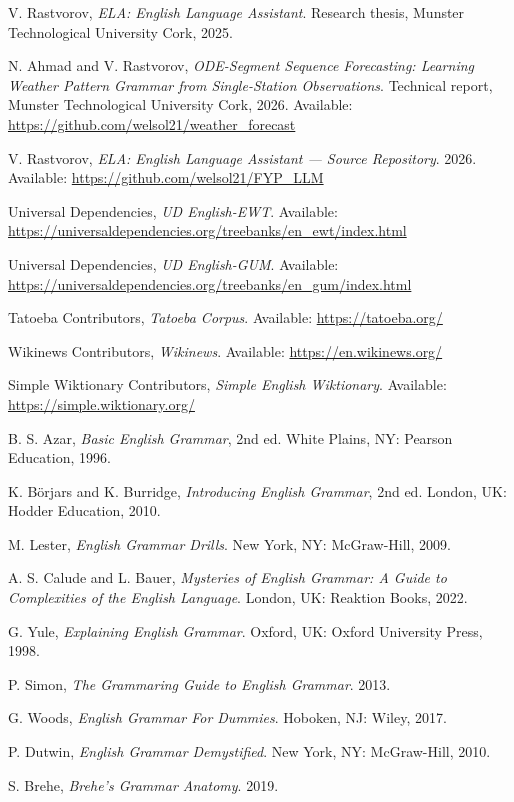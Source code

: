 \documentclass[12pt,a4paper,oneside]{report}
\begin{document}
\begin{enumerate}[label={[\arabic*]}]
  \item V. Rastvorov, \emph{ELA: English Language Assistant}. Research thesis, Munster Technological University Cork, 2025.
  \item N. Ahmad and V. Rastvorov, \emph{ODE-Segment Sequence Forecasting: Learning Weather Pattern Grammar from Single-Station Observations}. Technical report, Munster Technological University Cork, 2026. Available: \url{https://github.com/welsol21/weather_forecast}
  \item V. Rastvorov, \emph{ELA: English Language Assistant --- Source Repository}. 2026. Available: \url{https://github.com/welsol21/FYP_LLM}
  \item Universal Dependencies, \emph{UD English-EWT}. Available: \url{https://universaldependencies.org/treebanks/en_ewt/index.html}
  \item Universal Dependencies, \emph{UD English-GUM}. Available: \url{https://universaldependencies.org/treebanks/en_gum/index.html}
  \item Tatoeba Contributors, \emph{Tatoeba Corpus}. Available: \url{https://tatoeba.org/}
  \item Wikinews Contributors, \emph{Wikinews}. Available: \url{https://en.wikinews.org/}
  \item Simple Wiktionary Contributors, \emph{Simple English Wiktionary}. Available: \url{https://simple.wiktionary.org/}
  \item B. S. Azar, \emph{Basic English Grammar}, 2nd ed. White Plains, NY: Pearson Education, 1996.
  \item K. B\"orjars and K. Burridge, \emph{Introducing English Grammar}, 2nd ed. London, UK: Hodder Education, 2010.
  \item M. Lester, \emph{English Grammar Drills}. New York, NY: McGraw-Hill, 2009.
  \item A. S. Calude and L. Bauer, \emph{Mysteries of English Grammar: A Guide to Complexities of the English Language}. London, UK: Reaktion Books, 2022.
  \item G. Yule, \emph{Explaining English Grammar}. Oxford, UK: Oxford University Press, 1998.
  \item P. Simon, \emph{The Grammaring Guide to English Grammar}. 2013.
  \item G. Woods, \emph{English Grammar For Dummies}. Hoboken, NJ: Wiley, 2017.
  \item P. Dutwin, \emph{English Grammar Demystified}. New York, NY: McGraw-Hill, 2010.
  \item S. Brehe, \emph{Brehe's Grammar Anatomy}. 2019.

\end{enumerate}
\end{document}
